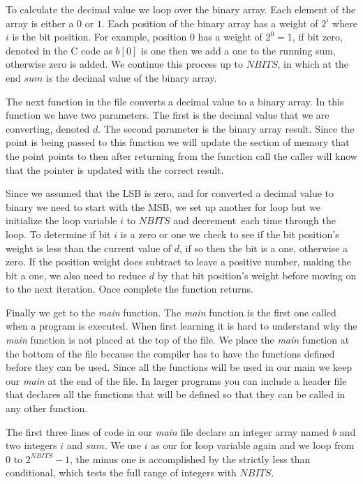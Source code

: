 To calculate the decimal value we loop over the binary array. Each element of the array is either a $0$ or $1$. Each position of the binary array has a weight of $2^i$ where $i$ is the bit position. For example, position $0$ has a weight of $2^0 = 1$, if bit zero, denoted in the C code as $b[0]$ is one then we add a one to the running sum, otherwise zero is added. We continue this process up to $NBITS$, in which at the end $sum$ is the decimal value of the binary array.

The next function in the file converts a decimal value to a binary array. In this function we have two parameters. The first is the decimal value that we are converting, denoted $d$. The second parameter is the binary array result. Since the point is being passed to this function we will update the section of memory that the point points to then after returning from the function call the caller will know that the pointer is updated with the correct result. 

Since we assumed that the \ac{LSB} is zero, and for converted a decimal value to binary we need to start with the \ac{MSB}, we set up another for loop but we initialize the loop variable $i$ to $NBITS$ and decrement each time through the loop. To determine if bit $i$ is a zero or one we check to see if the bit position's weight is less than the current value of $d$, if so then the bit is a one, otherwise a zero. If the position weight does subtract to leave a positive number, making the bit a one, we also need to reduce $d$ by that bit position's weight before moving on to the next iteration. Once complete the function returns. 

Finally we get to the \emph{main} function. The \emph{main} function is the first one called when a program is executed. When first learning it is hard to understand why the \emph{main} function is not placed at the top of the file. We place the \emph{main} function at the bottom of the file because the compiler has to have the functions defined before they can be used. Since all the functions will be used in our main we keep our \emph{main} at the end of the file. In larger programs you can include a header file that declares all the functions that will be defined so that they can be called in any other function. 

The first three lines of code in our \emph{main} file declare an integer array named $b$ and two integers $i$ and $sum$. We use $i$ as our for loop variable again and we loop from $0$ to $2^{NBITS}-1$, the minus one is accomplished by the strictly less than conditional, which tests the full range of integers with $NBITS$. 

